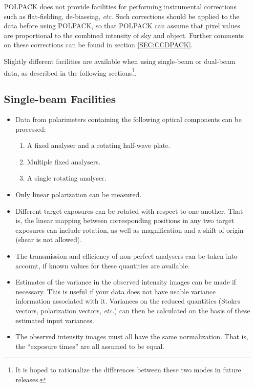 \documentclass[twoside,11pt]{article}
\newcommand{\hyperref}[4]{#2\ref{#4}#3}
\renewcommand{\_}{\texttt{\symbol{95}}}
\begin{document}
POLPACK does not provide facilities for performing instrumental
corrections such as flat-fielding, de-biassing, \emph{etc}. Such corrections
should be applied to the data before using POLPACK, so that POLPACK can
assume that pixel values are proportional to the combined intensity of
sky and object. Further comments on these corrections can be found
\hyperref{here}{in section }{}{SEC:CCDPACK}.

Slightly different facilities are available when using single-beam or
dual-beam data, as described in the following sections\footnote{It is
hoped to rationalize the differences between these two modes in future
releases.}.

\subsection{Single-beam Facilities}

\begin{itemize}

\item Data from polarimeters containing the following optical components 
can be processed:

\begin{enumerate}
\item A fixed analyser and a rotating half-wave plate.
\item Multiple fixed analysers.
\item A single rotating analyser.
\end{enumerate}

\item Only linear polarization can be measured. 

\item Different target exposures can be rotated with respect to one
another. That is, the linear mapping between corresponding positions in 
any two target 
exposures can include rotation, as well as magnification and a shift of 
origin (shear is not allowed).

\item The transmission and efficiency of non-perfect analysers can be
taken into account, if known values for these quantities are available.

\item Estimates of the variance in the observed intensity images can be made 
if necessary. This is useful if your data does not have usable variance
information associated with it. Variances on the reduced quantities
(Stokes vectors, polarization vectors, \emph{etc.}) can then be calculated 
on the basis of these estimated input variances.

\item The observed intensity images must all have the same normalization.
That is, the ``exposure times'' are all assumed to be equal.

\end{itemize}
\end{document}
